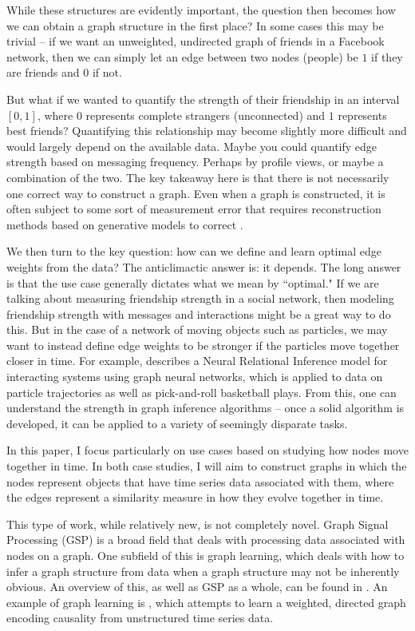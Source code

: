 \documentclass[12pt]{article}
\theoremstyle{definition}
\begin{document}
While these structures are evidently important, the question then becomes how we can obtain a graph structure in the first place? In some cases this may be trivial -- if we want an unweighted, undirected graph of friends in a Facebook network, then we can simply let an edge between two nodes (people) be $1$ if they are friends and $0$ if not.

But what if we wanted to quantify the strength of their friendship in an interval $[0,1]$, where $0$ represents complete strangers (unconnected) and $1$ represents best friends? Quantifying this relationship may become slightly more difficult and would largely depend on the available data. Maybe you could quantify edge strength based on messaging frequency. Perhaps by profile views, or maybe a combination of the two. The key takeaway here is that there is not necessarily one correct way to construct a graph. Even when a graph is constructed, it is often subject to some sort of measurement error that requires reconstruction methods based on generative models to correct \cite{PhysRevReconstructingNetworksErrors}.

We then turn to the key question: how can we define and learn optimal edge weights from the data? The anticlimactic answer is: it depends. The long answer is that the use case generally dictates what we mean by ``optimal." If we are talking about measuring friendship strength in a social network, then modeling friendship strength with messages and interactions might be a great way to do this. But in the case of a network of moving objects such as particles, we may want to instead define edge weights to be stronger if the particles move together closer in time. For example, \cite{kipf2018NRI} describes a Neural Relational Inference model for interacting systems using graph neural networks, which is applied to data on particle trajectories as well as pick-and-roll basketball plays. From this, one can understand the strength in graph inference algorithms -- once a solid algorithm is developed, it can be applied to a variety of seemingly disparate tasks.

In this paper, I focus particularly on use cases based on studying how nodes move together in time. In both case studies, I will aim to construct graphs in which the nodes represent objects that have time series data associated with them, where the edges represent a similarity measure in how they evolve together in time. 

This type of work, while relatively new, is not completely novel. Graph Signal Processing (GSP) is a broad field that deals with processing data associated with nodes on a graph. One subfield of this is graph learning, which deals with how to infer a graph structure from data when a graph structure may not be inherently obvious. An overview of this, as well as GSP as a whole, can be found in \cite{gspOverview}. An example of graph learning is \cite{causalModelingGraph}, which attempts to learn a weighted, directed graph encoding causality from unstructured time series data.
\end{document}
